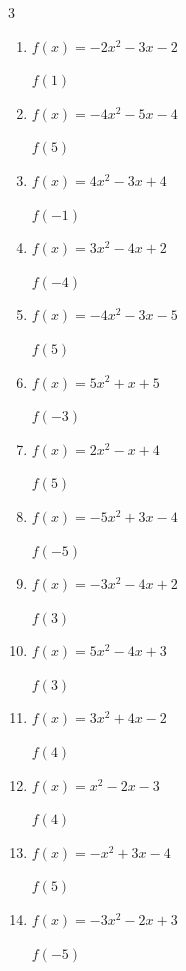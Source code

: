 \begin{multicols}{3}
\begin{enumerate}
\columnbreak %

  \item $f(x)=-2x^{2}-3x-2$

$f(1)$
        \phantom{$= -7$}

  \item $f(x)=-4x^{2}-5x-4$

$f(5)$
        \phantom{$= -129$}

  \item $f(x)=4x^{2}-3x+4$

$f(-1)$
        \phantom{$= 11$}

  \item $f(x)=3x^{2}-4x+2$

$f(-4)$
        \phantom{$= 66$}

  \item $f(x)=-4x^{2}-3x-5$

$f(5)$
        \phantom{$= -120$}

  \item $f(x)=5x^{2}+x+5$

$f(-3)$
        \phantom{$= 47$}

  \item $f(x)=2x^{2}-x+4$

$f(5)$
        \phantom{$= 49$}

  \item $f(x)=-5x^{2}+3x-4$

$f(-5)$
        \phantom{$= -144$}

  \item $f(x)=-3x^{2}-4x+2$

$f(3)$
        \phantom{$= -37$}

  \item $f(x)=5x^{2}-4x+3$

$f(3)$
        \phantom{$= 36$}

  \item $f(x)=3x^{2}+4x-2$

$f(4)$
        \phantom{$= 62$}

  \item $f(x)=x^{2}-2x-3$

$f(4)$
        \phantom{$= 5$}

  \item $f(x)=-x^{2}+3x-4$

$f(5)$
        \phantom{$= -14$}

  \item $f(x)=-3x^{2}-2x+3$

$f(-5)$
        \phantom{$= -62$}


\end{enumerate}
\end{multicols}
